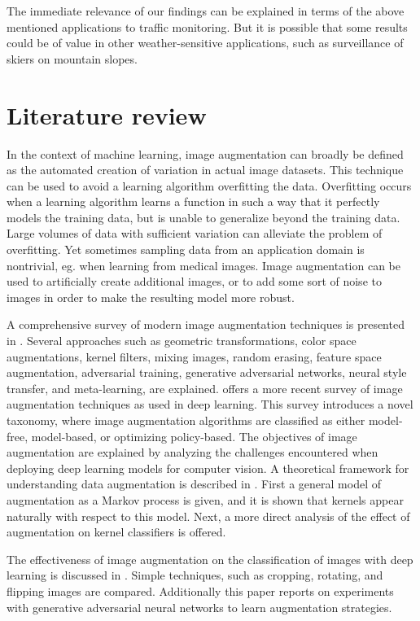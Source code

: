 \documentclass[]{article}
\begin{document}
	The immediate relevance of our findings can be explained in terms of the above mentioned applications to traffic monitoring. But it is possible that some results could be of value in other weather-sensitive applications, such as surveillance of skiers on mountain slopes.

\section{Literature review}

	In the context of machine learning, image augmentation can broadly be defined as the automated creation of variation in actual image datasets. This technique can be used to avoid a learning algorithm overfitting the data. Overfitting occurs when a learning algorithm learns a function in such a way that it perfectly models the training data, but is unable to generalize beyond the training data. Large volumes of data with sufficient variation can alleviate the problem of overfitting. Yet sometimes sampling data from an application domain is nontrivial, eg. when learning from medical images.  Image augmentation can be used to artificially create additional images, or to add some sort of noise to images in order to make the resulting model more robust.
	
	A comprehensive survey of modern image augmentation techniques is presented in \cite{shortenSurveyImageData2019}. Several approaches such as geometric transformations, color space augmentations, kernel filters, mixing images, random erasing, feature space augmentation, adversarial training, generative adversarial networks, neural style transfer, and meta-learning, are explained. \cite{xuComprehensiveSurveyImage2023} offers a more recent survey of image augmentation techniques as used in deep learning. This survey introduces a novel taxonomy, where image augmentation algorithms are classified as either model-free, model-based, or optimizing policy-based. The objectives of image augmentation are explained by analyzing the challenges encountered when deploying deep learning models for computer vision. A theoretical framework for understanding data augmentation is described in \cite{daoKernelTheoryModern2019}. First a general model of augmentation as a Markov process is given, and it is shown that kernels appear naturally with respect to this model. Next, a more direct analysis of the effect of augmentation on kernel classifiers is offered.
	
	The effectiveness of image augmentation on the classification of images with deep learning is discussed in \cite{perezEffectivenessDataAugmentation2017}. Simple techniques, such as cropping, rotating, and flipping images are compared. Additionally this paper reports on experiments with generative adversarial neural networks to learn augmentation strategies.
	
\end{document}
